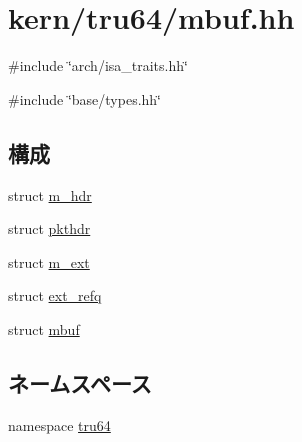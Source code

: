 \hypertarget{mbuf_8hh}{
\section{kern/tru64/mbuf.hh}
\label{mbuf_8hh}
}
{\ttfamily \#include \char`\"{}arch/isa\_\-traits.hh\char`\"{}}\par
{\ttfamily \#include \char`\"{}base/types.hh\char`\"{}}\par
\subsection*{構成}
\begin{DoxyCompactItemize}
\item 
struct \hyperlink{structtru64_1_1m__hdr}{m\_\-hdr}
\item 
struct \hyperlink{structtru64_1_1pkthdr}{pkthdr}
\item 
struct \hyperlink{structtru64_1_1m__ext}{m\_\-ext}
\item 
struct \hyperlink{structtru64_1_1m__ext_1_1ext__refq}{ext\_\-refq}
\item 
struct \hyperlink{structtru64_1_1mbuf}{mbuf}
\end{DoxyCompactItemize}
\subsection*{ネームスペース}
\begin{DoxyCompactItemize}
\item 
namespace \hyperlink{namespacetru64}{tru64}
\end{DoxyCompactItemize}
